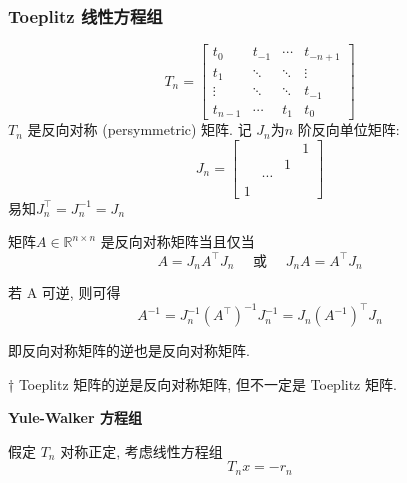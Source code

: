 \documentclass[12pt,a4paper]{article}
\begin{document}
\subsubsection{Toeplitz 线性方程组}
\begin{equation}
T_{n}=\left[\begin{array}{cccc}{t_{0}} & {t_{-1}} & {\cdots} & {t_{-n+1}} \\ {t_{1}} & {\ddots} & {\ddots} & {\vdots} \\ {\vdots} & {\ddots} & {\ddots} & {t_{-1}} \\ {t_{n-1}} & {\cdots} & {t_{1}} & {t_{0}}\end{array}\right]
\end{equation}
$T_n$ 是反向对称 (persymmetric) 矩阵. 记 $J_n $为$ n$ 阶反向单位矩阵:
\begin{equation}
J_{n}=\left[\begin{array}{cccc}{ } & { } & { } &{1} \\{ } & { } &{1} & { } \\ {} & {\cdots}& { } & { } \\ {1} &{ } &{ } &{ }\end{array}\right]
\end{equation}
易知$J_{n}^{\top}=J_{n}^{-1}=J_{n}$

\begin{framed}
	\begin{lemma}
		矩阵$ A ∈ \mathbb{R}^{n×n}$ 是反向对称矩阵当且仅当
			\begin{equation}
			A=J_{n} A^{\top} J_{n} \quad \text { 或 } \quad J_{n} A=A^{\top} J_{n}
			\end{equation}
	\end{lemma}
\end{framed}

若 A 可逆, 则可得
\begin{equation}
A^{-1}=J_{n}^{-1}\left(A^{\top}\right)^{-1} J_{n}^{-1}=J_{n}\left(A^{-1}\right)^{\top} J_{n}
\end{equation}

即反向对称矩阵的逆也是反向对称矩阵.
\begin{framed}
	† Toeplitz 矩阵的逆是反向对称矩阵, 但不一定是 Toeplitz 矩阵.
\end{framed}

{\bfseries Yule-Walker 方程组}

假定 $T_n$ 对称正定, 考虑线性方程组
\begin{equation}
T_{n} x=-r_{n}
\end{equation}
\end{document}
